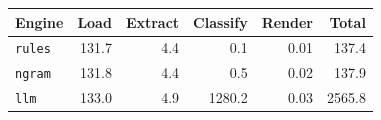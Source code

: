 \begingroup\small\setlength{\tabcolsep}{4pt}
\begin{tabular}{lrrrrr}
\toprule
\textbf{Engine} & \textbf{Load} & \textbf{Extract} & \textbf{Classify} & \textbf{Render} & \textbf{Total} \\
\midrule
\texttt{rules} & 131.7 & 4.4 & 0.1 & 0.01 & 137.4 \\  %
\texttt{ngram} & 131.8 & 4.4 & 0.5 & 0.02 & 137.9 \\  %
\texttt{llm} & 133.0 & 4.9 & 1280.2 & 0.03 & 2565.8 \\  %
\bottomrule
\end{tabular}
\endgroup
\par\smallskip{}
